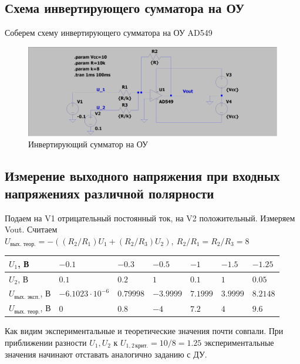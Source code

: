 \documentclass[a4paper, 12pt]{article}
\begin{document}
    \subsection{Схема инвертирующего сумматора на ОУ}
    Соберем схему инвертирующего сумматора на ОУ AD549
    \begin{figure}[H]
        \centering
        \includegraphics[scale=0.22]{scheme4.png}
        \captionsetup{skip=0pt}
        \caption{Инвертирующий сумматор на ОУ}
        \label{fig:scheme4}
    \end{figure}

    
    \subsection{Измерение выходного напряжения при входных напряжениях различной полярности}
    Подаем на V1 отрицательный постоянный ток, на V2 положительный. Измеряем Vout. Считаем
    $U_{\text{вых. теор.}}=-\left( \left(R_2/R_1\right)U_1+\left(R_2/R_3\right)U_2 \right),\ R_2/R_1=R_2/R_3=8$
    \begin{center}
        \begin{tabular}{ | m{6em} | m{4em}| m{4em} | m{4em} | m{4em} | m{4em} | m{4em} | } 
        \hline
        $U_1$, В& $-0.1$ &$-0.3$ &$-0.5$ &$-1$& $-1.5$ & $-1.25$\\ 
        \hline
        $U_2$, В& $0.1$ &$0.2$ &$1$ &$0.1$& $1$ & $0.05$\\ 
        \hline
        $U_{\text{вых. эксп.}}$, В& $-6.1023\cdot10^{-6}$ &$0.79998$ &$-3.9999$ &$7.1999$& $3.9999$ & $8.2148$\\
        \hline
        $U_{\text{вых. теор.}}$, В& $0$ &$0.8$ &$-4$ &$7.2$& $4$ & $9.6$\\
        \hline
        \end{tabular}
    \end{center}
    Как видим экспериментальные и теоретические значения почти совпали.
    При приближении разности $U_1,U_2$ к $U_{1,2\,\text{крит.}}=10/8=1.25$
    экспериментальные значения начинают отставать аналогично заданию с ДУ.
\end{document}
